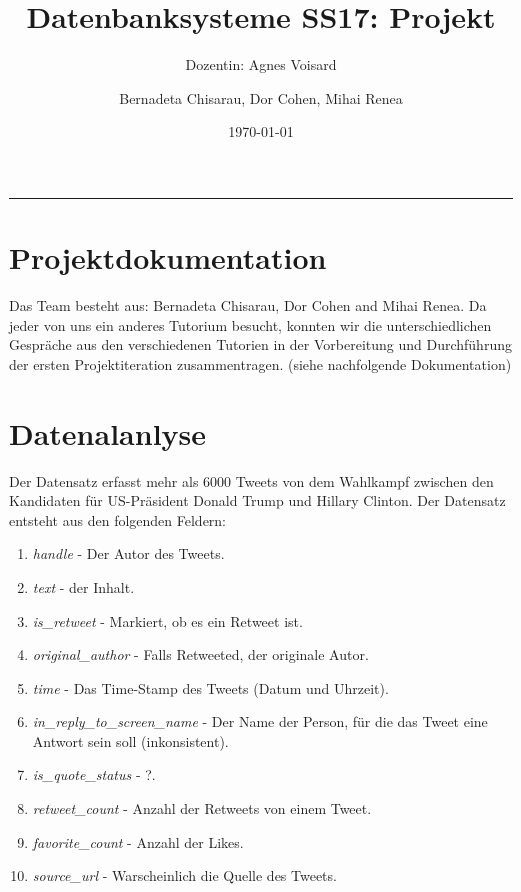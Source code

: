 \documentclass[paper=a4, english, ngerman, romanian]{scrartcl}
\begin{document}
\begin{titlepage}
	\title{Datenbanksysteme SS17: Projekt}	
	\subtitle{Dozentin: Agnes Voisard}
	\author{Bernadeta Chisarau, Dor Cohen, Mihai Renea}
	\date{\normalsize \today}
\end{titlepage}

\maketitle								%
\vspace*{-8cm}							%

\vspace{7cm}							%
\rule{\linewidth}{0.8pt}				%
	\section{Projektdokumentation}
	Das Team besteht aus: Bernadeta Chisarau, Dor Cohen and Mihai Renea. Da jeder von uns ein anderes Tutorium besucht, konnten wir die unterschiedlichen Gespräche aus den verschiedenen Tutorien in der Vorbereitung und Durchführung der ersten Projektiteration zusammentragen. (siehe nachfolgende Dokumentation)
	
	\section{Datenalanlyse}
		Der Datensatz erfasst mehr als 6000 Tweets von dem Wahlkampf zwischen den Kandidaten für US-Präsident Donald Trump und Hillary Clinton. Der Datensatz entsteht aus den folgenden Feldern:
		\begin{enumerate}
		\item \textit{handle} - Der Autor des Tweets.
		\item \textit{text} - der Inhalt.
		\item \textit{is\_retweet} - Markiert, ob es ein Retweet ist.
		\item \textit{original\_author} - Falls Retweeted, der originale Autor.
		\item \textit{time} - Das Time-Stamp des Tweets (Datum und Uhrzeit).
		\item \textit{in\_reply\_to\_screen\_name} - Der Name der Person, für die das Tweet eine Antwort sein soll (inkonsistent).
		\item \textit{is\_quote\_status} - ?.
		\item \textit{retweet\_count} - Anzahl der Retweets von einem Tweet.
		\item \textit{favorite\_count} - Anzahl der Likes.
		\item \textit{source\_url} - Warscheinlich die Quelle des Tweets.
		\end{enumerate}
		
\end{document}
